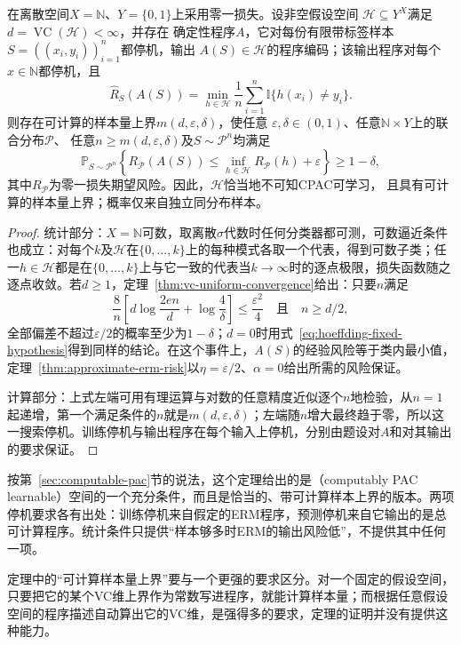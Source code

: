 \begin{theorem}[可计算ERM给出的学习保证]
\label{thm:computable-erm-pac}
在离散空间$X=\mathbb N$、$Y=\{0,1\}$上采用零一损失。设非空假设空间
$\mathcal H\subseteq Y^X$满足$d=\operatorname{VC}(\mathcal H)<\infty$，并存在
确定性程序$A$，它对每份有限带标签样本$S=((x_i,y_i))_{i=1}^n$都停机，输出
$A(S)\in\mathcal H$的程序编码；该输出程序对每个$x\in\mathbb N$都停机，且
\[
 \hat R_S(A(S))
 =\min_{h\in\mathcal H}\frac1n\sum_{i=1}^n\mathbb I\{h(x_i)\neq y_i\}.
\]
则存在可计算的样本量上界$m(d,\varepsilon,\delta)$，使任意
$\varepsilon,\delta\in(0,1)$、任意$\mathbb N\times Y$上的联合分布$\mathcal P$、
任意$n\geq m(d,\varepsilon,\delta)$及$S\sim\mathcal P^n$均满足
\[
 \mathbb P_{S\sim\mathcal P^n}\left\{
 R_{\mathcal P}(A(S))
 \leq\inf_{h\in\mathcal H}R_{\mathcal P}(h)+\varepsilon
 \right\}\geq1-\delta,
\]
其中$R_{\mathcal P}$为零一损失期望风险。因此，$\mathcal H$恰当地不可知CPAC可学习，
且具有可计算的样本量上界；概率仅来自独立同分布样本。
\end{theorem}

\begin{proof}
统计部分：$X=\mathbb N$可数，取离散$\sigma$代数时任何分类器都可测，可数逼近条件也成立：对每个$k$及$\mathcal H$在$\{0,\ldots,k\}$上的每种模式各取一个代表，得到可数子类；任一$h\in\mathcal H$都是在$\{0,\ldots,k\}$上与它一致的代表当$k\to\infty$时的逐点极限，损失函数随之逐点收敛。若$d\geq1$，定理~\ref{thm:vc-uniform-convergence}给出：只要$n$满足
\[
 \frac{8}{n}\left[d\log\frac{2en}{d}+\log\frac4\delta\right]\leq\frac{\varepsilon^2}{4}
 \quad\text{且}\quad n\geq d/2,
\]
全部偏差不超过$\varepsilon/2$的概率至少为$1-\delta$；$d=0$时用式~\eqref{eq:hoeffding-fixed-hypothesis}得到同样的结论。在这个事件上，$A(S)$的经验风险等于类内最小值，定理~\ref{thm:approximate-erm-risk}以$\eta=\varepsilon/2$、$\alpha=0$给出所需的风险保证。

计算部分：上式左端可用有理运算与对数的任意精度近似逐个$n$地检验，从$n=1$起递增，第一个满足条件的$n$就是$m(d,\varepsilon,\delta)$；左端随$n$增大最终趋于零，所以这一搜索停机。训练停机与输出程序在每个输入上停机，分别由题设对$A$和对其输出的要求保证。
\end{proof}

按第~\ref{sec:computable-pac}节的说法，这个定理给出的是（computably PAC learnable）空间的一个充分条件，而且是恰当的、带可计算样本上界的版本。两项停机要求各有出处：训练停机来自假定的ERM程序，预测停机来自它输出的是总可计算程序。统计条件只提供“样本够多时ERM的输出风险低”，不提供其中任何一项。

定理中的“可计算样本量上界”要与一个更强的要求区分。对一个固定的假设空间，只要把它的某个VC维上界作为常数写进程序，就能计算样本量；而根据任意假设空间的程序描述自动算出它的VC维，是强得多的要求，定理的证明并没有提供这种能力。

